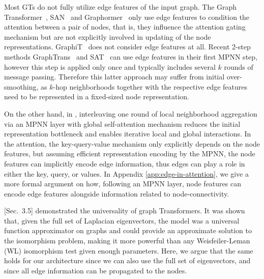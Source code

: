 \documentclass{article}
\begin{document}
Most GTs do not fully utilize edge features of the input graph. The Graph Transformer~\cite{dwivedi2020generalization}, SAN~\cite{kreuzer2021rethinking} and Graphormer~\cite{ying2021graphormer} only use edge features to condition the attention between a pair of nodes, that is, they influence the attention gating mechanism but are not explicitly involved in updating of the node representations. GraphiT~\cite{mialon2021graphit} does not consider edge features at all. Recent 2-step methods GraphTrans~\cite{jain2021graphtrans} and SAT~\cite{chen2022SAT} can use edge features in their first MPNN step, however this step is applied only once and typically includes several $k$ rounds of message passing. Therefore this latter approach may suffer from initial over-smoothing, as $k$-hop neighborhoods together with the respective edge features need to be represented in a fixed-sized node representation.

On the other hand, in \method, interleaving one round of local neighborhood aggregation via an MPNN layer with global self-attention mechanism reduces the initial representation bottleneck and enables iterative local and global interactions. In the attention, the key-query-value mechanism only explicitly depends on the node features, but assuming efficient representation encoding by the MPNN, the node features can implicitly encode edge information, thus edges can play a role in either the key, query, or values. In Appendix \ref{app:edge-in-attention}, we give a more formal argument on how, following an MPNN layer, node features can encode edge features alongside information related to node-connectivity.


\citet{kreuzer2021rethinking}[Sec.~3.5] demonstrated the universality of graph Transformers. It was shown that, given the full set of Laplacian eigenvectors, the model was a universal function approximator on graphs and could provide an approximate solution to the isomorphism problem, making it more powerful than any Weisfeiler-Leman (WL) isomorphism test given enough parameters.
Here, we argue that the same holds for our architecture since we can also use the full set of eigenvectors, and since all edge information can be propagated to the nodes.
\end{document}
